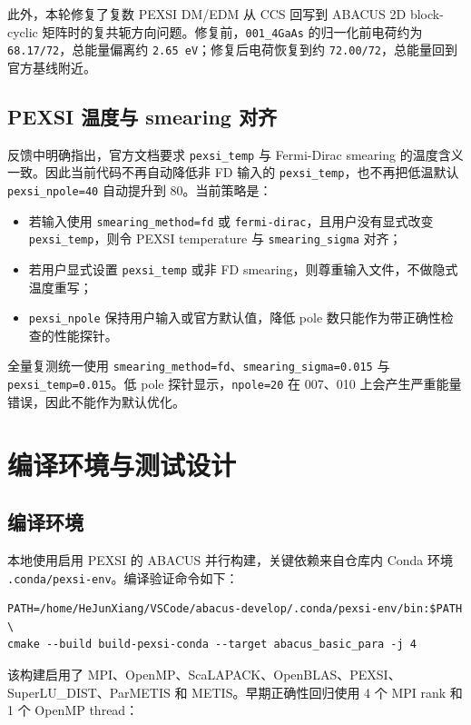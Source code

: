 \documentclass[a4paper,11pt]{article}
\newcommand{\code}[1]{\texttt{#1}}
\begin{document}
此外，本轮修复了复数 PEXSI DM/EDM 从 CCS 回写到 ABACUS 2D block-cyclic 矩阵时的复共轭方向问题。修复前，\code{001\_4GaAs} 的归一化前电荷约为 \code{68.17/72}，总能量偏离约 \code{2.65 eV}；修复后电荷恢复到约 \code{72.00/72}，总能量回到官方基线附近。

\subsection{PEXSI 温度与 smearing 对齐}

反馈中明确指出，官方文档要求 \code{pexsi\_temp} 与 Fermi-Dirac smearing 的温度含义一致。因此当前代码不再自动降低非 FD 输入的 \code{pexsi\_temp}，也不再把低温默认 \code{pexsi\_npole=40} 自动提升到 80。当前策略是：

\begin{itemize}
    \item 若输入使用 \code{smearing\_method=fd} 或 \code{fermi-dirac}，且用户没有显式改变 \code{pexsi\_temp}，则令 PEXSI temperature 与 \code{smearing\_sigma} 对齐；
    \item 若用户显式设置 \code{pexsi\_temp} 或非 FD smearing，则尊重输入文件，不做隐式温度重写；
    \item \code{pexsi\_npole} 保持用户输入或官方默认值，降低 pole 数只能作为带正确性检查的性能探针。
\end{itemize}

全量复测统一使用 \code{smearing\_method=fd}、\code{smearing\_sigma=0.015} 与 \code{pexsi\_temp=0.015}。低 pole 探针显示，\code{npole=20} 在 007、010 上会产生严重能量错误，因此不能作为默认优化。

\section{编译环境与测试设计}

\subsection{编译环境}

本地使用启用 PEXSI 的 ABACUS 并行构建，关键依赖来自仓库内 Conda 环境 \code{.conda/pexsi-env}。编译验证命令如下：

\begin{verbatim}
PATH=/home/HeJunXiang/VSCode/abacus-develop/.conda/pexsi-env/bin:$PATH \
cmake --build build-pexsi-conda --target abacus_basic_para -j 4
\end{verbatim}

该构建启用了 MPI、OpenMP、ScaLAPACK、OpenBLAS、PEXSI、SuperLU\_DIST、ParMETIS 和 METIS。早期正确性回归使用 4 个 MPI rank 和 1 个 OpenMP thread：
\end{document}
